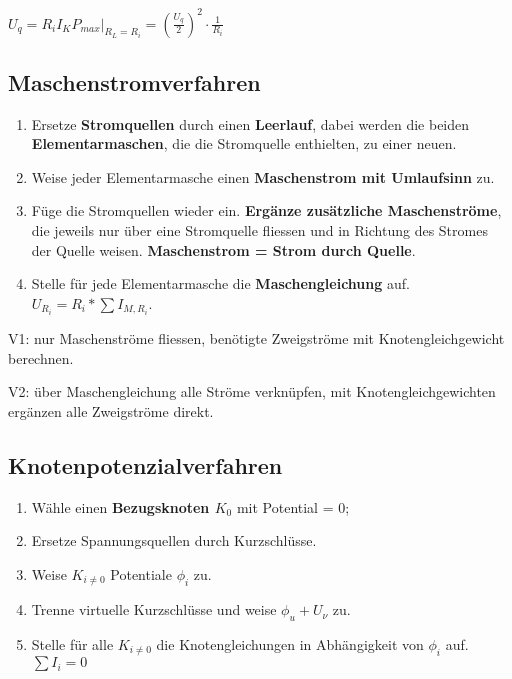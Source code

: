 \documentclass[10pt,a4paper]{scrartcl}
\begin{document}
\begin{multicols*}{3}
	
	$U_q=R_iI_K$\hfill$P_{max}|_{R_L=R_i}=\left(\frac{U_q}{2}\right)^2\cdot \frac{1}{R_i}$
	
	\vfill
	\null
	\columnbreak
	
	\subsection{Maschenstromverfahren}
	
	\begin{enumerate}
	
	\item
	Ersetze \textbf{Stromquellen} durch einen \textbf{Leerlauf}, dabei werden die beiden \textbf{Elementarmaschen}, die die Stromquelle enthielten, zu einer neuen.
	\item
	Weise jeder Elementarmasche einen \textbf{Maschenstrom mit Umlaufsinn} zu.
	\item
	Füge die Stromquellen wieder ein. \textbf{Ergänze zusätzliche Maschenströme}, die jeweils nur über eine Stromquelle fliessen und in Richtung des Stromes der Quelle weisen. \textbf{Maschenstrom = Strom durch Quelle}.
	\item
	Stelle für jede Elementarmasche die \textbf{Maschengleichung} auf. $U_{R_i}=R_i*\sum{I_{M,R_i}}$.
	
	\end{enumerate}
	
	V1: nur Maschenströme fliessen, benötigte Zweigströme mit Knotengleichgewicht berechnen.
	
	V2: über Maschengleichung alle Ströme verknüpfen, mit Knotengleichgewichten ergänzen \dahe alle Zweigströme direkt.
	
	\subsection{Knotenpotenzialverfahren}	

	\begin{enumerate}
	\item
	Wähle einen \textbf{Bezugsknoten $K_0$} mit Potential = 0;
	\item
	Ersetze Spannungsquellen durch Kurzschlüsse.
	\item
	Weise $K_{i\neq 0}$ Potentiale $\phi_i$ zu.
	\item
	Trenne virtuelle Kurzschlüsse und weise $\phi_u+U_{\nu}$ zu.
	\item
	Stelle für alle $K_{i\neq 0}$ die Knotengleichungen in Abhängigkeit von $\phi_i$ auf. $\sum{I_i}=0$
	\end{enumerate}
	

\end{multicols*}
\end{document}
